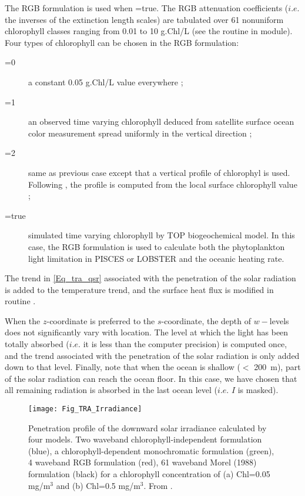 \documentclass[NEMO_book]{subfiles}
\begin{document}
The RGB formulation is used when =true. The RGB attenuation coefficients
($i.e.$ the inverses of the extinction length scales) are tabulated over 61 nonuniform 
chlorophyll classes ranging from 0.01 to 10 g.Chl/L (see the routine  
in  module). Four types of chlorophyll can be chosen in the RGB formulation:
\begin{description} 
\item[=0] 
a constant 0.05 g.Chl/L value everywhere ; 
\item[=1]  
an observed time varying chlorophyll deduced from satellite surface ocean color measurement 
spread uniformly in the vertical direction ; 
\item[=2]  
same as previous case except that a vertical profile of chlorophyl is used. 
Following \cite{Morel_Berthon_LO89}, the profile is computed from the local surface chlorophyll value ;
\item[=true]  
simulated time varying chlorophyll by TOP biogeochemical model. 
In this case, the RGB formulation is used to calculate both the phytoplankton 
light limitation in PISCES or LOBSTER and the oceanic heating rate. 
\end{description} 
The trend in \eqref{Eq_tra_qsr} associated with the penetration of the solar radiation 
is added to the temperature trend, and the surface heat flux is modified in routine . 

When the $z$-coordinate is preferred to the $s$-coordinate, the depth of $w-$levels does 
not significantly vary with location. The level at which the light has been totally 
absorbed ($i.e.$ it is less than the computer precision) is computed once, 
and the trend associated with the penetration of the solar radiation is only added down to that level. 
Finally, note that when the ocean is shallow ($<$ 200~m), part of the 
solar radiation can reach the ocean floor. In this case, we have 
chosen that all remaining radiation is absorbed in the last ocean 
level ($i.e.$ $I$ is masked). 

\begin{figure}[!t] 	  \begin{center}
\texttt{[image: Fig\_TRA\_Irradiance]}
\caption{ 	 \label{Fig_traqsr_irradiance}
Penetration profile of the downward solar irradiance calculated by four models. 
Two waveband chlorophyll-independent formulation (blue), a chlorophyll-dependent 
monochromatic formulation (green), 4 waveband RGB formulation (red), 
61 waveband Morel (1988) formulation (black) for a chlorophyll concentration of 
(a) Chl=0.05 mg/m$^3$ and (b) Chl=0.5 mg/m$^3$. From \citet{Lengaigne_al_CD07}.}
\end{center}   \end{figure}
\end{document}
